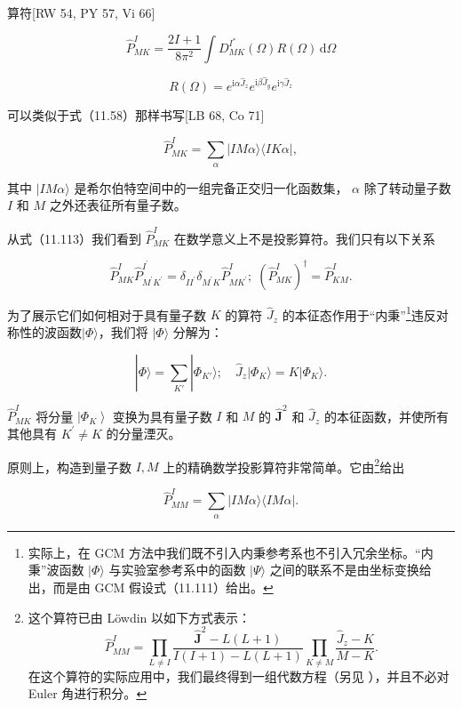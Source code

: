 算符{[}RW 54, PY 57, Vi 66{]}

\[
{\widehat{P}}^{I}_{MK}=\frac{{2I}+1}{8{\pi}^{2}}\int{D}^{{I}^{*}}_{MK}\left(\Omega\right)R\left(\Omega\right){\,\mathrm{d}\Omega}\tag{11.112}
\]

\[
R\left(\Omega\right)={e}^{{\mathrm{i}\alpha}{\widehat{J}}_{z}}{e}^{{\mathrm{i}\beta}{\widehat{J}}_{y}}{e}^{{\mathrm{i}\gamma}{\widehat{J}}_{z}}
\]

可以类似于式（11.58）那样书写{[}LB 68, Co 71{]}

\[
\widehat{P}^{I}_{MK}=\mathop{\sum}\limits_{\alpha}|IM\alpha\rangle\langle IK\alpha|,\tag{11.113}
\]

其中 $|{IM\alpha}\rangle$ 是希尔伯特空间中的一组完备正交归一化函数集， $\alpha$ 除了转动量子数
$I$ 和 $M$ 之外还表征所有量子数。

从式（11.113）我们看到 ${\widehat{P}}^{I}_{MK}$ 在数学意义上不是投影算符。我们只有以下关系

\[
{\widehat{P}}^{I}_{MK}{\widehat{P}}^{{I}^{\prime}}_{{M}^{\prime}{K}^{\prime}}={\delta}_{I{I}^{\prime}}{\delta}_{{M}^{\prime}K}{\widehat{P}}^{I}_{M{K}^{\prime}};\;\left({\widehat{P}}^{I}_{MK}\right)^{\dagger}={\widehat{P}}^{I}_{KM}.\tag{11.114}
\]

为了展示它们如何相对于具有量子数 $K$ 的算符 ${\widehat{J}}_{z}$ 的本征态作用于“内秉”\footnote{实际上，在 GCM 方法中我们既不引入内秉参考系也不引入冗余坐标。“内秉”波函数 $|\Phi\rangle$ 与实验室参考系中的函数
$|\Psi\rangle$ 之间的联系不是由坐标变换给出，而是由 GCM 假设式（11.111）给出。}违反对称性的波函数$|\Phi\rangle$，我们将 $|\Phi\rangle$ 分解为：

\[
|\Phi\rangle=\mathop{\sum}\limits_{K'}|\Phi_{K'}\rangle;\quad\widehat{J}_{z}|\Phi_{K}\rangle=K|\Phi_{K}\rangle.\tag{11.115}
\]

${\widehat{P}}^{I}_{MK}$ 将分量 $\left|{\Phi}_{K}\right\rangle $ 变换为具有量子数
$I$ 和 $M$ 的 ${\widehat{\boldsymbol{J}}}^{2}$ 和 ${\widehat{J}}_{z}$
的本征函数，并使所有其他具有 ${K}^{\prime}\neq K$ 的分量湮灭。

原则上，构造到量子数 $I,M$ 上的精确数学投影算符非常简单。它由\footnote{这个算符已由 Löwdin \cite{Lo64} 以如下方式表示：
\[
\hat{P}^{I}_{MM}=\prod_{L\neq I}\frac{\hat{\boldsymbol{J}}^{2}-L(L+1)}{I(I+1)-L(L+1)}\prod_{K\neq M}\frac{\hat{J}_{z}-K}{M-K}.
\]
在这个算符的实际应用中，我们最终得到一组代数方程（另见 \cite{KL64,Ke66,Ul71,Ul72,MKL71,MM76}），并且不必对
Euler 角进行积分。}给出

\[
\widehat{P}^{I}_{MM}=\mathop{\sum}\limits_{\alpha}|IM\alpha\rangle\langle IM\alpha|.\tag{11.116}
\]

